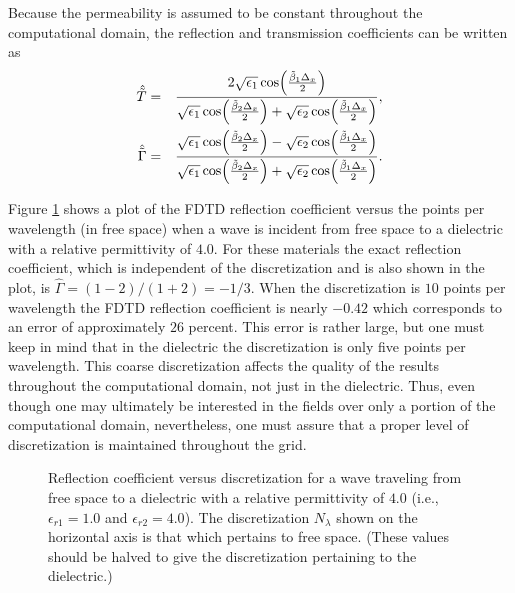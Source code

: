 Because the permeability is assumed to be constant throughout the
computational domain, the reflection and transmission coefficients can
be written as
\begin{eqnarray}
  \hat{\tilde{T}} &=& \frac{2 \sqrt{\epsilon_1} \cos\!\left(\frac{\tilde{\beta}_1\Delta_x}{2}\right)}
             {\sqrt{\epsilon_1} \cos\!\left(\frac{\tilde{\beta}_2\Delta_x}{2}\right)
            + \sqrt{\epsilon_2} \cos\!\left(\frac{\tilde{\beta}_1\Delta_x}{2}\right)},
  \label{eq:fdtdTransCoefI}
  \\
  \hat{\tilde{\Gamma}} &=& \frac{\sqrt{\epsilon_1} \cos\!\left(\frac{\tilde{\beta}_2\Delta_x}{2}\right)
            - \sqrt{\epsilon_2} \cos\!\left(\frac{\tilde{\beta}_1\Delta_x}{2}\right)}
             {\sqrt{\epsilon_1} \cos\!\left(\frac{\tilde{\beta}_2\Delta_x}{2}\right)
            + \sqrt{\epsilon_2} \cos\!\left(\frac{\tilde{\beta}_1\Delta_x}{2}\right)}.
  \label{eq:fdtdRefCoefI}
\end{eqnarray}

Figure \ref{fig:refCoefOneFour} shows a plot of the FDTD reflection
coefficient versus the points per wavelength (in free space) when a
wave is incident from free space to a dielectric with a relative
permittivity of $4.0$.  For these materials the exact reflection
coefficient, which is independent of the discretization and is also
shown in the plot, is $\hat{\Gamma} = (1-2)/(1+2) = -1/3$.  When the
discretization is $10$ points per wavelength the FDTD reflection
coefficient is nearly $-0.42$ which corresponds to an error of
approximately $26$ percent.  This error is rather large, but one must
keep in mind that in the dielectric the discretization is only five
points per wavelength.  This coarse discretization affects the quality
of the results throughout the computational domain, not just in the
dielectric.  Thus, even though one may ultimately be interested in the
fields over only a portion of the computational domain, nevertheless,
one must assure that a proper level of discretization is maintained
throughout the grid.

\begin{figure}
  \begin{center}
  \end{center} \caption{Reflection coefficient versus discretization
  for a wave traveling from free space to a dielectric with a relative
  permittivity of $4.0$ (i.e., $\epsilon_{r1} = 1.0$ and
  $\epsilon_{r2} = 4.0$).  The discretization $N_\lambda$ shown on the
  horizontal axis is that which pertains to free space.  (These values
  should be halved to give the discretization pertaining to the
  dielectric.)}
  \label{fig:refCoefOneFour}
\end{figure}

